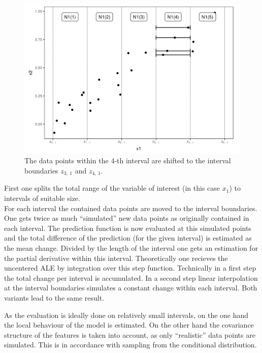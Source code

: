 \documentclass[
]{krantz}
\begin{document}
\begin{figure}
\includegraphics[width=13.75in]{images/ale_estimation_intuition} \caption{The data points within the 4-th interval are shifted to the interval boundaries \(z_{3,~1}\) and \(z_{4,~1}\).}\label{fig:dataALE}
\end{figure}



First one splits the total range of the variable of interest (in this case \(x_1\)) to intervals of suitable size.\\
For each interval the contained data points are moved to the interval boundaries. One gets twice as much ``simulated'' new data points as originally contained in each interval. The prediction function is now evaluated at this simulated points and the total difference of the prediction (for the given interval) is estimated as the mean change. Divided by the length of the interval one gets an estimation for the partial derivative within this interval. Theoretically one recieves the uncentered ALE by integration over this step function. Technically in a first step the total change per interval is accumulated. In a second step linear interpolation at the interval boundaries simulates a constant change within each interval. Both variants lead to the same result.

As the evaluation is ideally done on relatively small intervals, on the one hand the local behaviour of the model is estimated. On the other hand the covariance structure of the features is taken into account, as only ``realistic'' data points are simulated. This is in accordance with sampling from the conditional distribution.
\end{document}
